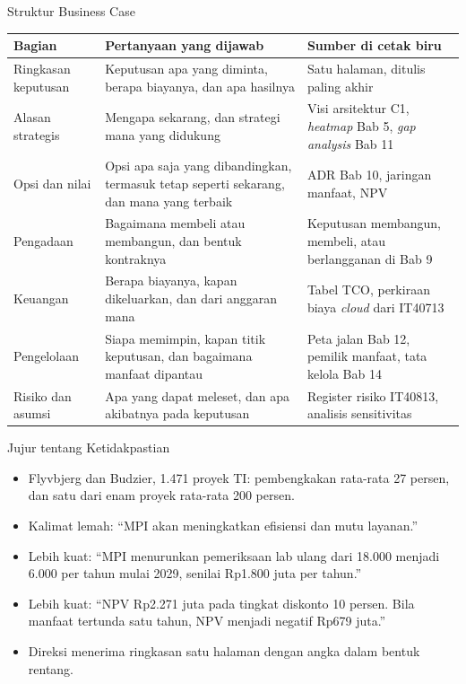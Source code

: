\documentclass[aspectratio=169, table, 12pt]{beamer}
\begin{document}
\begin{frame}{{\Large Struktur Business Case}}
  \scriptsize
  \begin{tabularx}{\textwidth}{L{2.4cm}YY}
    \hline
    \textbf{Bagian} & \textbf{Pertanyaan yang dijawab} & \textbf{Sumber di cetak biru} \\
    \hline
    Ringkasan keputusan & Keputusan apa yang diminta, berapa biayanya, dan apa
      hasilnya & Satu halaman, ditulis paling akhir \\
    \hline
    Alasan strategis & Mengapa sekarang, dan strategi mana yang didukung &
      Visi arsitektur C1, \textit{heatmap} Bab 5, \textit{gap analysis} Bab 11 \\
    \hline
    Opsi dan nilai & Opsi apa saja yang dibandingkan, termasuk tetap seperti
      sekarang, dan mana yang terbaik & ADR Bab 10, jaringan manfaat, NPV \\
    \hline
    Pengadaan & Bagaimana membeli atau membangun, dan bentuk kontraknya &
      Keputusan membangun, membeli, atau berlangganan di Bab 9 \\
    \hline
    Keuangan & Berapa biayanya, kapan dikeluarkan, dan dari anggaran mana &
      Tabel TCO, perkiraan biaya \textit{cloud} dari IT40713 \\
    \hline
    Pengelolaan & Siapa memimpin, kapan titik keputusan, dan bagaimana
      manfaat dipantau & Peta jalan Bab 12, pemilik manfaat, tata kelola Bab 14 \\
    \hline
    Risiko dan asumsi & Apa yang dapat meleset, dan apa akibatnya pada
      keputusan & Register risiko IT40813, analisis sensitivitas \\
    \hline
  \end{tabularx}
\end{frame}

\begin{frame}{{\Large Jujur tentang Ketidakpastian}}
  \small
  \vspace{4pt}
  \begin{itemize}
    \item Flyvbjerg dan Budzier, 1.471 proyek TI: pembengkakan rata-rata 27 persen, dan satu dari enam
          proyek rata-rata 200 persen.
    \item Kalimat lemah: ``MPI akan meningkatkan efisiensi dan mutu layanan.''
    \item Lebih kuat: ``MPI menurunkan pemeriksaan lab ulang dari 18.000 menjadi 6.000 per tahun mulai
          2029, senilai Rp1.800 juta per tahun.''
    \item Lebih kuat: ``NPV Rp2.271 juta pada tingkat diskonto 10 persen. Bila manfaat tertunda satu
          tahun, NPV menjadi negatif Rp679 juta.''
    \item Direksi menerima ringkasan satu halaman dengan angka dalam bentuk rentang.
  \end{itemize}
\end{frame}
\end{document}

